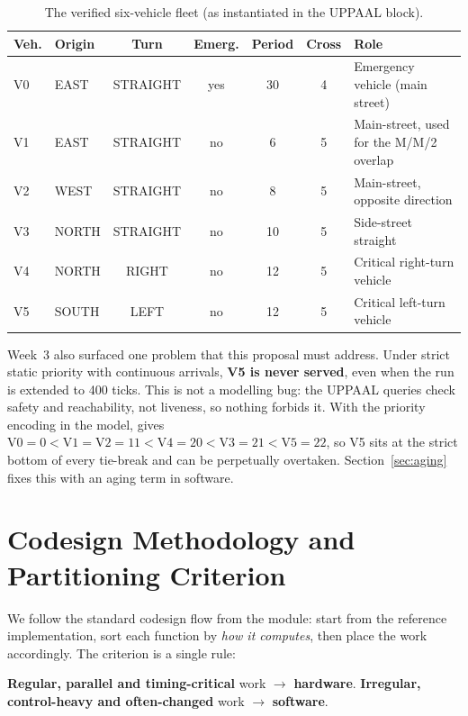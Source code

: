 \documentclass[11pt]{article}
\newcommand{\code}[1]{\texttt{\detokenize{#1}}}
\begin{document}
\begin{table}[h]
\centering
\caption{The verified six-vehicle fleet (as instantiated in the UPPAAL \code{system} block).}
\label{tab:fleet}
\small
\begin{tabular}{@{}llccccl@{}}
\toprule
\textbf{Veh.} & \textbf{Origin} & \textbf{Turn} & \textbf{Emerg.} & \textbf{Period} & \textbf{Cross} & \textbf{Role} \\
\midrule
V0 & EAST  & STRAIGHT & yes & 30 & 4 & Emergency vehicle (main street) \\
V1 & EAST  & STRAIGHT & no & 6  & 5 & Main-street, used for the M/M/2 overlap \\
V2 & WEST  & STRAIGHT & no & 8  & 5 & Main-street, opposite direction \\
V3 & NORTH & STRAIGHT & no & 10 & 5 & Side-street straight \\
V4 & NORTH & RIGHT    & no & 12 & 5 & Critical right-turn vehicle \\
V5 & SOUTH & LEFT     & no & 12 & 5 & Critical left-turn vehicle \\
\bottomrule
\end{tabular}
\end{table}

\noindent
Week~3 also surfaced one problem that this proposal must address. Under strict static priority with
continuous arrivals, \textbf{V5 is never served}, even when the run is extended to 400 ticks. This is
not a modelling bug: the UPPAAL queries check safety and reachability, not liveness, so nothing forbids
it. With the priority encoding in the model, \code{priorityValue} gives
$\text{V0}{=}0 < \text{V1}{=}\text{V2}{=}11 < \text{V4}{=}20 < \text{V3}{=}21 < \text{V5}{=}22$, so V5 sits
at the strict bottom of every tie-break and can be perpetually overtaken. Section~\ref{sec:aging}
fixes this with an aging term in software.

\section{Codesign Methodology and Partitioning Criterion}
We follow the standard codesign flow from the module: start from the reference implementation, sort each
function by \emph{how it computes}, then place the work accordingly. The criterion is a single rule:

\begin{center}
\colorbox{neubg}{%
\begin{minipage}{0.96\textwidth}
\small\centering
\textbf{Regular, parallel and timing-critical} work $\to$ \textbf{hardware}.\qquad
\textbf{Irregular, control-heavy and often-changed} work $\to$ \textbf{software}.
\end{minipage}}
\end{center}
\end{document}
